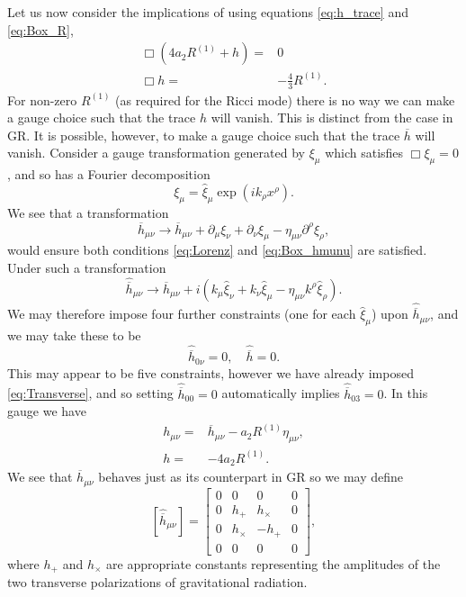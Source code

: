 Let us now consider the implications of  using equations \eqref{eq:h_trace} and \eqref{eq:Box_R},
\begin{align}
\Box\left(4a_2R^{(1)} + h\right) = {} & 0 \nonumber \\
\Box h = {} & -\frac{4}{3}R^{(1)}.
\end{align}
For non-zero $R^{(1)}$ (as required for the Ricci mode) there is no way we can make a gauge choice such that the trace $h$ will vanish\cite{Corda2007, Capozziello2008}. This is distinct from the case in GR. It is possible, however, to make a gauge choice such that the trace $\overline{h}$ will vanish. Consider a gauge transformation generated by $\xi_\mu$ which satisfies $\Box \xi_\mu = 0$, and so has a Fourier decomposition
\begin{equation}
\xi_\mu = \widehat{\xi}_\mu \exp\left(ik_\rho x^\rho\right).
\end{equation}
We see that a transformation
\begin{equation}
\overline{h}_{\mu\nu} \rightarrow \overline{h}_{\mu\nu} + \partial_\mu\xi_\nu + \partial_\nu\xi_\mu - \eta_{\mu\nu}\partial^\rho\xi_\rho,
\end{equation}
would ensure both conditions \eqref{eq:Lorenz} and \eqref{eq:Box_hmunu} are satisfied\cite{Misner1973}. Under such a transformation
\begin{equation}
\widehat{\overline{h}}_{\mu\nu} \rightarrow \widehat{\overline{h}}_{\mu\nu} + i\left(k_\mu\widehat{\xi}_\nu + k_\nu\widehat{\xi}_\mu - \eta_{\mu\nu}k^\rho\widehat{\xi}_\rho\right).
\end{equation}
We may therefore impose four further constraints (one for each $\widehat{\xi}_\mu$) upon $\widehat{\overline{h}}_{\mu\nu}$, and we may take these to be
\begin{equation}
\widehat{\overline{h}}_{0\nu} = 0, \quad \widehat{\overline{h}} = 0.
\end{equation}
This may appear to be five constraints, however we have already imposed \eqref{eq:Transverse}, and so setting $\widehat{\overline{h}}_{00} = 0$ automatically implies $\widehat{\overline{h}}_{03} = 0$. In this gauge we have
\begin{align}
h_{\mu\nu} = {} & \overline{h}_{\mu\nu} - a_2 R^{(1)}\eta_{\mu\nu},\\
h = {} & -4a_2R^{(1)}.
\label{eq:gauge}
\end{align}
We see that $\overline{h}_{\mu\nu}$ behaves just as its counterpart in GR so we may define
\begin{equation}
\left[\widehat{\overline{h}}_{\mu\nu}\right] =
\begin{bmatrix}
0 & 0 & 0 & 0\\
0 & h_+ & h_\times & 0\\
0 & h_\times & -h_+ & 0\\
0 & 0 & 0 & 0
\end{bmatrix},
\end{equation}
where $h_+$ and $h_\times$ are appropriate constants representing the amplitudes of the two transverse polarizations of gravitational radiation.

